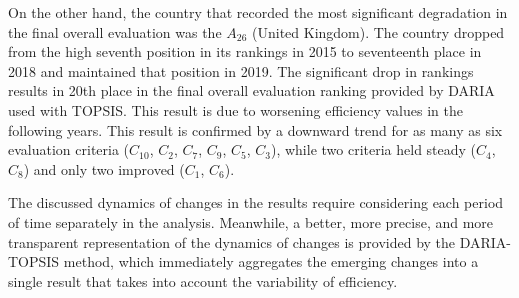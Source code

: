 \documentclass[final,5p,times,twocolumn,authoryear]{elsarticle}
\begin{document}
On the other hand, the country that recorded the most significant degradation in the final overall evaluation was the $A_{26}$ (United Kingdom). The country dropped from the high seventh position in its rankings in 2015 to seventeenth place in 2018 and maintained that position in 2019. The significant drop in rankings results in 20th place in the final overall evaluation ranking provided by DARIA used with TOPSIS. This result is due to worsening efficiency values in the following years. This result is confirmed by a downward trend for as many as six evaluation criteria ($C_{10}$, $C_{2}$, $C_{7}$, $C_{9}$, $C_{5}$, $C_{3}$), while two criteria held steady ($C_{4}$, $C_{8}$) and only two improved ($C_{1}$, $C_{6}$). 

The discussed dynamics of changes in the results require considering each period of time separately in the analysis. Meanwhile, a better, more precise, and more transparent representation of the dynamics of changes is provided by the DARIA-TOPSIS method, which immediately aggregates the emerging changes into a single result that takes into account the variability of efficiency.
%
\end{document}
